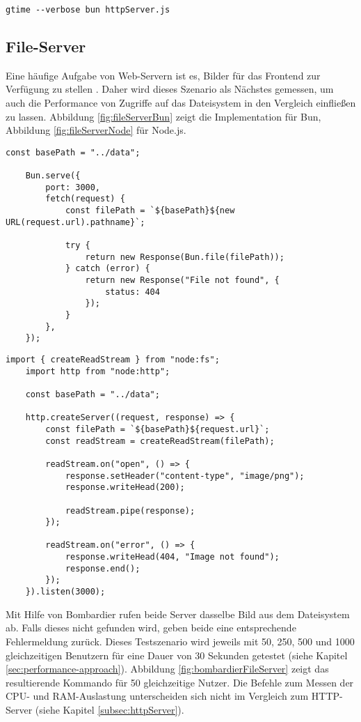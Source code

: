\begin{lstlisting}[caption={Bombardier HTTP-Server},label={fig:timeHTTPServerMacOS}]
	gtime --verbose bun httpServer.js
\end{lstlisting}

\subsection{File-Server} \label{subsec:fileServer}
Eine häufige Aufgabe von Web-Servern ist es, Bilder für das Frontend zur Verfügung zu stellen . Daher wird dieses Szenario als Nächstes gemessen, um auch die Performance von Zugriffe auf das Dateisystem in den Vergleich einfließen zu lassen. \newline
Abbildung  \ref{fig:fileServerBun} zeigt die Implementation für Bun, Abbildung \ref{fig:fileServerNode} für Node.js.

\begin{lstlisting}[caption={File-Server Bun.js},label={fig:fileServerBun}]
	const basePath = "../data";
	
	Bun.serve({
		port: 3000,
		fetch(request) {
			const filePath = `${basePath}${new URL(request.url).pathname}`;
			
			try {
				return new Response(Bun.file(filePath));
			} catch (error) {
				return new Response("File not found", {
					status: 404
				});
			}
		},
	});
\end{lstlisting}

\begin{lstlisting}[caption={File-Server Node.js},label={fig:fileServerNode}]
	import { createReadStream } from "node:fs";
	import http from "node:http";
	
	const basePath = "../data";
	
	http.createServer((request, response) => {
		const filePath = `${basePath}${request.url}`;
		const readStream = createReadStream(filePath);
		
		readStream.on("open", () => {
			response.setHeader("content-type", "image/png");
			response.writeHead(200);
			
			readStream.pipe(response);
		});
		
		readStream.on("error", () => {
			response.writeHead(404, "Image not found");
			response.end();
		});
	}).listen(3000);
\end{lstlisting}

\noindent
Mit Hilfe von Bombardier rufen beide Server dasselbe Bild aus dem Dateisystem ab. Falls dieses nicht gefunden wird, geben beide eine entsprechende Fehlermeldung zurück. Dieses Testszenario wird jeweils mit 50, 250, 500 und 1000 gleichzeitigen Benutzern für eine Dauer von 30 Sekunden getestet (siehe Kapitel \ref{sec:performance-approach}). Abbildung  \ref{fig:bombardierFileServer} zeigt das resultierende Kommando für 50 gleichzeitige Nutzer. Die Befehle zum Messen der CPU- und RAM-Auslastung unterscheiden sich nicht im Vergleich zum HTTP-Server (siehe Kapitel \ref{subsec:httpServer}).

